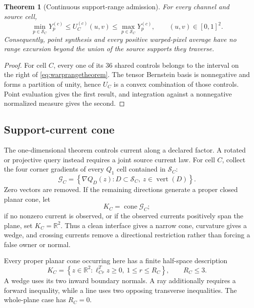 \documentclass[journal]{IEEEtran}
\newtheorem{theorem}{Theorem}
\newcommand{\R}{\mathbb{R}}
\begin{document}
\begin{theorem}[Continuous support-range admission]
For every channel and source cell,
\begin{equation}
 \min_{p\in\mathcal S_C}Y_p^{(c)}
 \leq U_C^{(c)}(u,v)\leq
 \max_{p\in\mathcal S_C}Y_p^{(c)},
 \qquad (u,v)\in[0,1]^2.
 \label{eq:warprangetheorem}
\end{equation}
Consequently, point synthesis and every positive warped-pixel average have no
range excursion beyond the union of the source supports they traverse.
\end{theorem}

\begin{proof}
For cell \(C\), every one of its 36 shared controls belongs to the interval
on the right of \eqref{eq:warprangetheorem}.  The tensor Bernstein basis is
nonnegative and forms a partition of unity, hence \(U_C\) is a convex
combination of those controls.  Point evaluation gives the first result, and
integration against a nonnegative normalized measure gives the second.
\end{proof}

\subsection{Support-current cone}

The one-dimensional theorem controls current along a declared factor.  A
rotated or projective query instead requires a joint source current law.  For
cell \(C\), collect the four corner gradients of every \(Q_1\) cell contained
in \(\mathcal S_C\):
\begin{equation}
 \mathcal G_C=
 \left\{\nabla Q_D(z):D\subset\mathcal S_C,
              \ z\in\operatorname{vert}(D)\right\}.
 \label{eq:warpgenerators}
\end{equation}
Zero vectors are removed.  If the remaining directions generate a proper
closed planar cone, let
\begin{equation}
 K_C=\operatorname{cone}\mathcal G_C;
 \label{eq:warpcone}
\end{equation}
if no nonzero current is observed, or if the observed currents positively
span the plane, set \(K_C=\R^2\).  Thus a clean interface gives a narrow
cone, curvature gives a wedge, and crossing currents remove a directional
restriction rather than forcing a false owner or normal.

Every proper planar cone occurring here has a finite half-space description
\begin{equation}
 K_C=\left\{z\in\R^2:\ell_{Cr}^Tz\geq0,
                       \ 1\leq r\leq R_C\right\},
 \qquad R_C\leq3.
 \label{eq:warpconedual}
\end{equation}
A wedge uses its two inward boundary normals.  A ray additionally requires a
forward inequality, while a line uses two opposing transverse inequalities.
The whole-plane case has \(R_C=0\).
\end{document}
